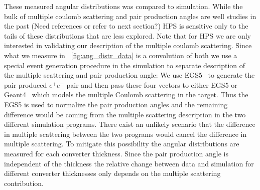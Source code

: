 These measured angular distributions was compared to simulation. 
While the bulk of multiple coulomb scattering and pair production angles 
are well studies in the past {\color{red} (Need references or refer to next section?)} HPS 
is sensitive only to the tails of these distributions that are less explored. Note that for HPS 
we are only interested in validating our description of the multiple coulomb scattering. Since 
what we measure in ~\ref{fig:ang_distr_data} is a convolution of both we use a special event 
generation procedure in the simulation to separate description of the multiple scattering and 
pair production angle: We use EGS5~\cite{egs5} to generate the pair produced $e^+e^-$ pair 
and then pass these four vectors to either {\sc EGS5} or {\sc Geant4}~\cite{geant4} which 
models the multiple Coulomb scattering in the target. Thus the {\sc EGS5} is used to normalize 
the pair production angles and the remaining difference would be coming from the 
multiple scattering description in the two different simulation programs. There exist an unlikely 
scenario that the difference in multiple scattering between the two programs would cancel the difference in multiple scattering. To mitigate this possibility the angular distributions are 
measured for each converter thickness. Since the pair production angle is independent of 
the thickness the relative change between data and simulation for different converter thicknesses only depends on the multiple scattering contribution. 

